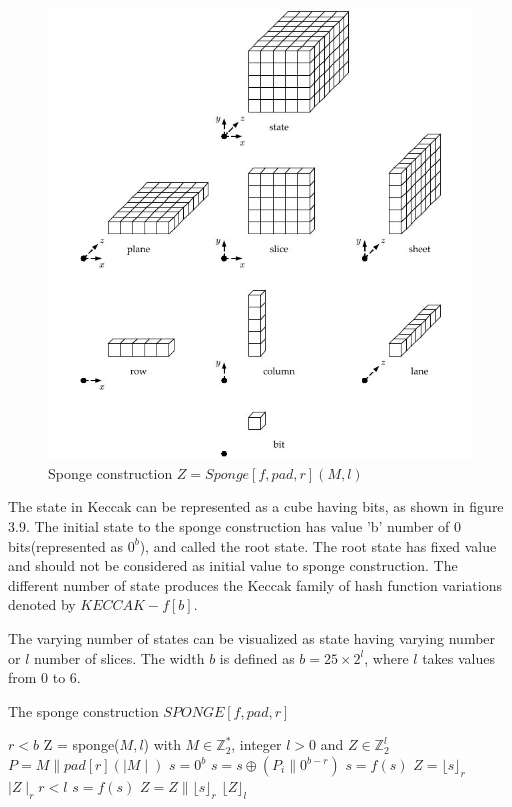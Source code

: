   \begin{figure}
    \begin{center}
      \includegraphics[width=6.5in]{keccakstateterminology.jpg}
    \end{center}
    \caption{Sponge construction $Z = Sponge[f, pad, r](M, l)$}
    \label{fig:lab}
  \end{figure}

  The state in Keccak can be represented as a cube having bits, as shown in figure 3.9. The initial state to the sponge
  construction has value 'b' number of 0 bits(represented as $0^{b}$), and called the root state. The root state has fixed
  value and should not be considered as initial value to sponge construction. The different number of state produces
  the Keccak family of hash function variations denoted by $KECCAK-f[b]$.
  
  The varying number of states can be visualized as state having varying number or $l$ number of slices. The width $b$ is
  defined as $b = 25 \times 2^{l}$, where $l$ takes values from 0 to 6.
  
  \begin{algorithm}
    \caption{The sponge construction $SPONGE[f, pad, r]$}
    \begin{algorithmic}[1]
      \Require $r < b$
       Z = sponge($M, l$) with $M \in \mathbb{Z}^{*}_{2}$, integer $ l > 0$ and $Z \in \mathbb{Z}^{l}_{2}$
      \State $P = M \parallel pad[r](\mid M \mid)$
      \State $s = 0^{b}$
      \State {}
        \State $s = s \oplus ( P_{i} \parallel 0^{b - r})$
        \State $s = f(s)$
      \State \EndFor
      \State $ Z = \lfloor s \rfloor_{r}$
      \State \While $\mid Z \mid_{r} r < l $
        \State $s = f(s)$
        \State $Z = Z \parallel \lfloor s \rfloor_{r}$
      \State \EndWhile
      \State \Return $\lfloor Z \rfloor_{l}$ 
    \end{algorithmic}
  \end{algorithm}

